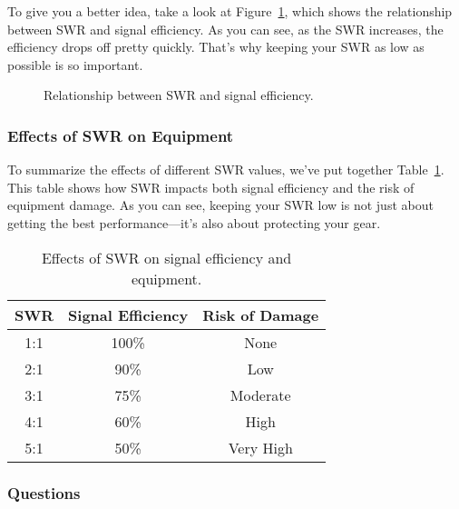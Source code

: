 To give you a better idea, take a look at Figure~\ref{fig:swr-efficiency}, which shows the relationship between SWR and signal efficiency. As you can see, as the SWR increases, the efficiency drops off pretty quickly. That’s why keeping your SWR as low as possible is so important.

\begin{figure}[h!]
    \centering
    \caption{Relationship between SWR and signal efficiency.}
    \label{fig:swr-efficiency}
\end{figure}

\subsubsection*{Effects of SWR on Equipment}
To summarize the effects of different SWR values, we’ve put together Table~\ref{tab:swr-effects}. This table shows how SWR impacts both signal efficiency and the risk of equipment damage. As you can see, keeping your SWR low is not just about getting the best performance—it’s also about protecting your gear.

\begin{table}[h!]
    \centering
    \begin{tabular}{|c|c|c|}
        \hline
        \textbf{SWR} & \textbf{Signal Efficiency} & \textbf{Risk of Damage} \\
        \hline
        1:1 & 100\% & None \\
        2:1 & 90\% & Low \\
        3:1 & 75\% & Moderate \\
        4:1 & 60\% & High \\
        5:1 & 50\% & Very High \\
        \hline
    \end{tabular}
    \caption{Effects of SWR on signal efficiency and equipment.}
    \label{tab:swr-effects}
\end{table}

\subsubsection{Questions}

